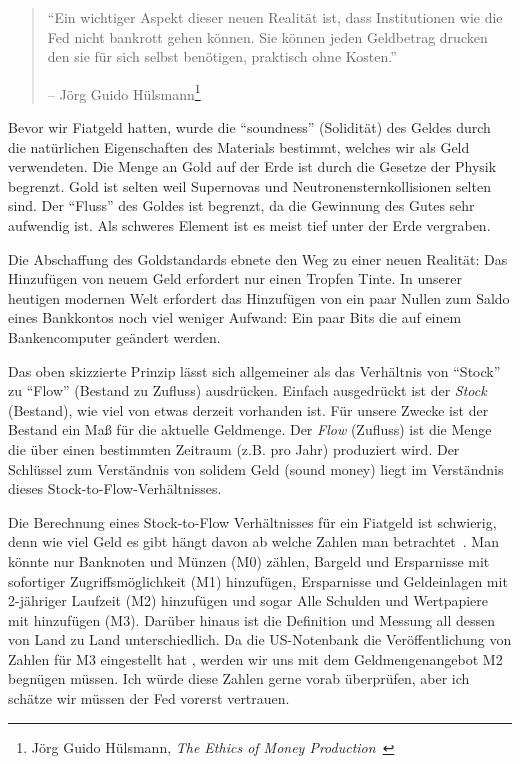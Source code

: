 \begin{samepage}\begin{quotation}
\enquote{Ein wichtiger Aspekt dieser neuen Realität ist, dass Institutionen wie
die Fed nicht bankrott gehen können. Sie können jeden Geldbetrag drucken den sie
für sich selbst benötigen, praktisch ohne Kosten.}
\begin{flushright} -- Jörg Guido Hülsmann\footnote{Jörg Guido Hülsmann, \textit{The
Ethics of Money Production}~\cite{hulsmann2008ethics}}
\end{flushright}\end{quotation}\end{samepage}

Bevor wir Fiatgeld hatten, wurde die \enquote{soundness} (Solidität) des Geldes
durch die natürlichen Eigenschaften des Materials bestimmt, welches wir als Geld
verwendeten. Die Menge an Gold auf der Erde ist durch die Gesetze der Physik
begrenzt. Gold ist selten weil Supernovas und Neutronensternkollisionen selten
sind. Der \enquote{Fluss} des Goldes ist begrenzt, da die Gewinnung des Gutes
sehr aufwendig ist. Als schweres Element ist es meist tief unter der Erde
vergraben.

Die Abschaffung des Goldstandards ebnete den Weg zu einer neuen Realität: Das
Hinzufügen von neuem Geld erfordert nur einen Tropfen Tinte. In unserer heutigen
modernen Welt erfordert das Hinzufügen von ein paar Nullen zum Saldo eines
Bankkontos noch viel weniger Aufwand: Ein paar Bits die auf einem Bankencomputer
geändert werden.

Das oben skizzierte Prinzip lässt sich allgemeiner als das Verhältnis von
\enquote{Stock} zu \enquote{Flow} (Bestand zu Zufluss) ausdrücken. Einfach
ausgedrückt ist der \textit{Stock} (Bestand), wie viel von etwas derzeit
vorhanden ist. Für unsere Zwecke ist der Bestand ein Maß für die aktuelle
Geldmenge. Der \textit{Flow} (Zufluss) ist die Menge die über einen bestimmten
Zeitraum (z.B. pro Jahr) produziert wird. Der Schlüssel zum Verständnis von
solidem Geld (sound money) liegt im Verständnis dieses
Stock-to-Flow-Verhältnisses.

Die Berechnung eines Stock-to-Flow Verhältnisses für ein Fiatgeld ist schwierig,
denn wie viel Geld es gibt hängt davon ab welche Zahlen man
betrachtet~\cite{wiki:money-supply}. Man könnte nur Banknoten und Münzen (M0)
zählen, Bargeld und Ersparnisse mit sofortiger Zugriffsmöglichkeit (M1)
hinzufügen, Ersparnisse und Geldeinlagen mit 2-jähriger Laufzeit (M2) hinzufügen
und sogar Alle Schulden und Wertpapiere mit hinzufügen (M3). Darüber hinaus ist
die Definition und Messung all dessen von Land zu Land unterschiedlich. Da die
US-Notenbank die Veröffentlichung von Zahlen für M3 eingestellt hat
\cite{web:fed-m3}, werden wir uns mit dem Geldmengenangebot M2 begnügen müssen.
Ich würde diese Zahlen gerne vorab überprüfen, aber ich schätze wir müssen der
Fed vorerst vertrauen.

